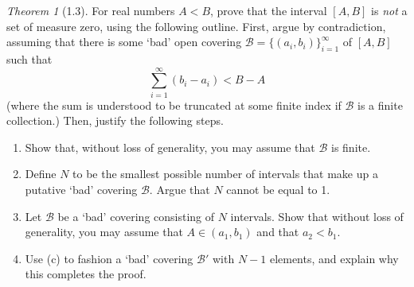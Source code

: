 \documentclass[12pt]{article}
\theoremstyle{remark}
\theoremstyle{named}
\newtheorem*{theorem}{Theorem}
\begin{document}
\begin{theorem}[1.3]
    For real numbers \(A < B\), prove that the interval \([A, B]\) is \textit{not} a set of measure zero, using the following outline. First, argue by contradiction, assuming that there is some `bad' open covering \(\mathcal B = \{(a_i, b_i)\}_{i = 1}^\infty\) of \([A, B]\) such that 
    \[\sum_{i = 1}^\infty (b_i - a_i) < B - A\]
    (where the sum is understood to be truncated at some finite index if \(\mathcal B\) is a finite collection.) Then, justify the following steps.
    \begin{enumerate}
        \item Show that, without loss of generality, you may assume that \(\mathcal B\) is finite.
        \item Define \(N\) to be the smallest possible number of intervals that make up a putative `bad' covering \(\mathcal B\). Argue that \(N\) cannot be equal to 1.
        \item Let \(\mathcal B\) be a `bad' covering consisting of \(N\) intervals. Show that without loss of generality, you may assume that \(A \in (a_1, b_1)\) and that \(a_2 < b_1\).
        \item Use (c) to fashion a `bad' covering \(\mathcal B'\) with \(N - 1\) elements, and explain why this completes the proof.
    \end{enumerate}
\end{theorem}
\end{document}
